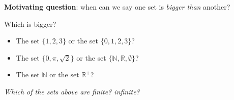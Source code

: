 
{\bf Motivating question}: when can we say one set is {\it bigger than} another?

Which is bigger? 
\begin{itemize}
    \item The set $\{1,2,3\}$ or the set $\{0,1,2,3\}$?
    \item The set $\{0, \pi, \sqrt{2} \}$ or the set $\{\mathbb{N}, \mathbb{R}, \emptyset\}$?
    \item The set $\mathbb{N}$ or the set $\mathbb{R}^+$?
\end{itemize}

{\it Which of the sets above are finite? infinite?}